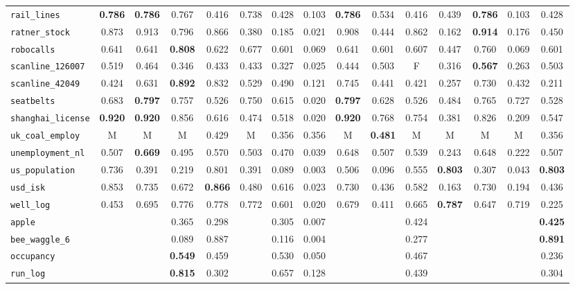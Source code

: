 \begin{tabular}{lcccccccccccccc}
\verb+rail_lines+ & \textbf{0.786} & \textbf{0.786} & 0.767 & 0.416 & 0.738 & 0.428 & 0.103 & \textbf{0.786} & 0.534 & 0.416 & 0.439 & \textbf{0.786} & 0.103 & 0.428\\
\verb+ratner_stock+ & 0.873 & 0.913 & 0.796 & 0.866 & 0.380 & 0.185 & 0.021 & 0.908 & 0.444 & 0.862 & 0.162 & \textbf{0.914} & 0.176 & 0.450\\
\verb+robocalls+ & 0.641 & 0.641 & \textbf{0.808} & 0.622 & 0.677 & 0.601 & 0.069 & 0.641 & 0.601 & 0.607 & 0.447 & 0.760 & 0.069 & 0.601\\
\verb+scanline_126007+ & 0.519 & 0.464 & 0.346 & 0.433 & 0.433 & 0.327 & 0.025 & 0.444 & 0.503 & F & 0.316 & \textbf{0.567} & 0.263 & 0.503\\
\verb+scanline_42049+ & 0.424 & 0.631 & \textbf{0.892} & 0.832 & 0.529 & 0.490 & 0.121 & 0.745 & 0.441 & 0.421 & 0.257 & 0.730 & 0.432 & 0.211\\
\verb+seatbelts+ & 0.683 & \textbf{0.797} & 0.757 & 0.526 & 0.750 & 0.615 & 0.020 & \textbf{0.797} & 0.628 & 0.526 & 0.484 & 0.765 & 0.727 & 0.528\\
\verb+shanghai_license+ & \textbf{0.920} & \textbf{0.920} & 0.856 & 0.616 & 0.474 & 0.518 & 0.020 & \textbf{0.920} & 0.768 & 0.754 & 0.381 & 0.826 & 0.209 & 0.547\\
\verb+uk_coal_employ+ & M & M & M & 0.429 & M & 0.356 & 0.356 & M & \textbf{0.481} & M & M & M & M & 0.356\\
\verb+unemployment_nl+ & 0.507 & \textbf{0.669} & 0.495 & 0.570 & 0.503 & 0.470 & 0.039 & 0.648 & 0.507 & 0.539 & 0.243 & 0.648 & 0.222 & 0.507\\
\verb+us_population+ & 0.736 & 0.391 & 0.219 & 0.801 & 0.391 & 0.089 & 0.003 & 0.506 & 0.096 & 0.555 & \textbf{0.803} & 0.307 & 0.043 & \textbf{0.803}\\
\verb+usd_isk+ & 0.853 & 0.735 & 0.672 & \textbf{0.866} & 0.480 & 0.616 & 0.023 & 0.730 & 0.436 & 0.582 & 0.163 & 0.730 & 0.194 & 0.436\\
\verb+well_log+ & 0.453 & 0.695 & 0.776 & 0.778 & 0.772 & 0.601 & 0.020 & 0.679 & 0.411 & 0.665 & \textbf{0.787} & 0.647 & 0.719 & 0.225\\
\hline
\verb+apple+ &  &  & 0.365 & 0.298 &  & 0.305 & 0.007 &  &  & 0.424 &  &  &  & \textbf{0.425}\\
\verb+bee_waggle_6+ &  &  & 0.089 & 0.887 &  & 0.116 & 0.004 &  &  & 0.277 &  &  &  & \textbf{0.891}\\
\verb+occupancy+ &  &  & \textbf{0.549} & 0.459 &  & 0.530 & 0.050 &  &  & 0.467 &  &  &  & 0.236\\
\verb+run_log+ &  &  & \textbf{0.815} & 0.302 &  & 0.657 & 0.128 &  &  & 0.439 &  &  &  & 0.304\\
\hline
\end{tabular}
